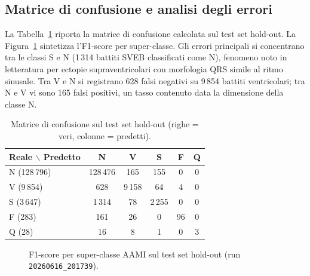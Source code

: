 \subsection{Matrice di confusione e analisi degli errori}

La Tabella~\ref{tab:confusion-matrix} riporta la matrice di confusione calcolata sul test set hold-out.
La Figura~\ref{fig:f1-per-classe} sintetizza l'F1-score per super-classe.
Gli errori principali si concentrano tra le classi S e N (1\,314 battiti SVEB classificati come N), fenomeno noto in letteratura per ectopie supraventricolari con morfologia QRS simile al ritmo sinusale.
Tra V e N si registrano 628 falsi negativi su 9\,854 battiti ventricolari; tra N e V vi sono 165 falsi positivi, un tasso contenuto data la dimensione della classe N.

\begin{table}[H]
  \centering
  \caption{Matrice di confusione sul test set hold-out (righe = veri, colonne = predetti).}
  \label{tab:confusion-matrix}
  \begin{tabular}{@{}lccccc@{}}
    \toprule
    \textbf{Reale $\backslash$ Predetto} & \textbf{N} & \textbf{V} & \textbf{S} & \textbf{F} & \textbf{Q} \\
    \midrule
    N (128\,796) & 128\,476 & 165 & 155 & 0 & 0 \\
    V (9\,854)   & 628      & 9\,158 & 64 & 4 & 0 \\
    S (3\,647)   & 1\,314   & 78  & 2\,255 & 0 & 0 \\
    F (283)      & 161      & 26  & 0   & 96 & 0 \\
    Q (28)       & 16       & 8   & 1   & 0  & 3 \\
    \bottomrule
  \end{tabular}
\end{table}

\begin{figure}[H]
  \centering
  \caption{F1-score per super-classe AAMI sul test set hold-out (run \texttt{20260616\_201739}).}
  \label{fig:f1-per-classe}
\end{figure}

